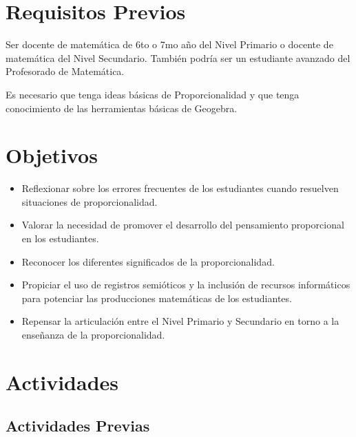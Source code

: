 \documentclass[oneside,spanish]{amsart}
\numberwithin{equation}{section}
\numberwithin{figure}{section}
\begin{document}
\section{Requisitos Previos}

Ser docente de matemática de 6to o 7mo año del Nivel Primario o docente de matemática del Nivel Secundario. También podría ser un estudiante avanzado del Profesorado de Matemática.

Es necesario que tenga ideas básicas de Proporcionalidad y que tenga conocimiento de las  herramientas básicas de Geogebra.


\section{Objetivos}
\begin{itemize}[itemsep=10pt]
    \item Reflexionar sobre los errores frecuentes de los estudiantes cuando resuelven situaciones de proporcionalidad.
    \item Valorar la necesidad de promover el desarrollo del pensamiento proporcional en los estudiantes.
    \item Reconocer los diferentes significados de la proporcionalidad.
    \item Propiciar el uso de registros semióticos y la inclusión de recursos informáticos para potenciar las producciones matemáticas de los estudiantes.
    \item Repensar la articulación entre el Nivel Primario y Secundario en torno a   la enseñanza de la proporcionalidad.
\end{itemize}
\section{Actividades}

\subsection{Actividades Previas}
\end{document}
